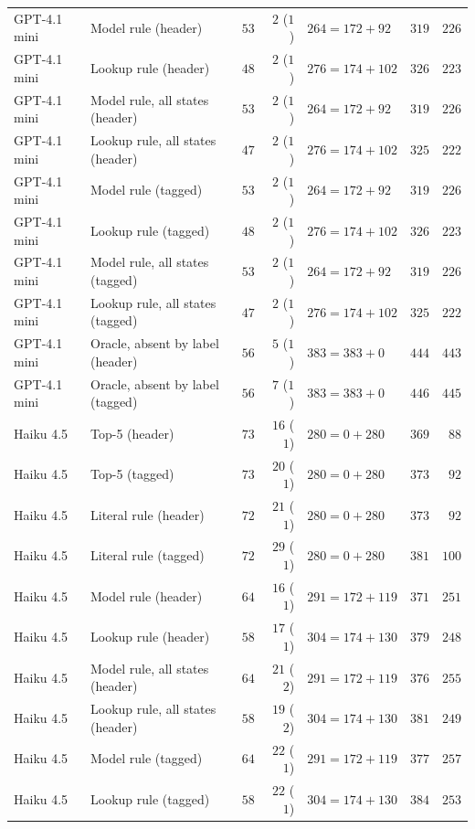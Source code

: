 \begin{table}[H]
\begin{tabular}{@{}llrrlrr@{}}
GPT-4.1 mini & Model rule (header) & $53$ & $2$ ($1$) & $264 = 172 + 92$ & $319$ & $226$ \\
GPT-4.1 mini & Lookup rule (header) & $48$ & $2$ ($1$) & $276 = 174 + 102$ & $326$ & $223$ \\
GPT-4.1 mini & Model rule, all states (header) & $53$ & $2$ ($1$) & $264 = 172 + 92$ & $319$ & $226$ \\
GPT-4.1 mini & Lookup rule, all states (header) & $47$ & $2$ ($1$) & $276 = 174 + 102$ & $325$ & $222$ \\
GPT-4.1 mini & Model rule (tagged) & $53$ & $2$ ($1$) & $264 = 172 + 92$ & $319$ & $226$ \\
GPT-4.1 mini & Lookup rule (tagged) & $48$ & $2$ ($1$) & $276 = 174 + 102$ & $326$ & $223$ \\
GPT-4.1 mini & Model rule, all states (tagged) & $53$ & $2$ ($1$) & $264 = 172 + 92$ & $319$ & $226$ \\
GPT-4.1 mini & Lookup rule, all states (tagged) & $47$ & $2$ ($1$) & $276 = 174 + 102$ & $325$ & $222$ \\
GPT-4.1 mini & Oracle, absent by label (header) & $56$ & $5$ ($1$) & $383 = 383 + 0$ & $444$ & $443$ \\
GPT-4.1 mini & Oracle, absent by label (tagged) & $56$ & $7$ ($1$) & $383 = 383 + 0$ & $446$ & $445$ \\ \midrule
Haiku 4.5 & Top-5 (header) & $73$ & $16$ ($1$) & $280 = 0 + 280$ & $369$ & $88$ \\
Haiku 4.5 & Top-5 (tagged) & $73$ & $20$ ($1$) & $280 = 0 + 280$ & $373$ & $92$ \\
Haiku 4.5 & Literal rule (header) & $72$ & $21$ ($1$) & $280 = 0 + 280$ & $373$ & $92$ \\
Haiku 4.5 & Literal rule (tagged) & $72$ & $29$ ($1$) & $280 = 0 + 280$ & $381$ & $100$ \\
Haiku 4.5 & Model rule (header) & $64$ & $16$ ($1$) & $291 = 172 + 119$ & $371$ & $251$ \\
Haiku 4.5 & Lookup rule (header) & $58$ & $17$ ($1$) & $304 = 174 + 130$ & $379$ & $248$ \\
Haiku 4.5 & Model rule, all states (header) & $64$ & $21$ ($2$) & $291 = 172 + 119$ & $376$ & $255$ \\
Haiku 4.5 & Lookup rule, all states (header) & $58$ & $19$ ($2$) & $304 = 174 + 130$ & $381$ & $249$ \\
Haiku 4.5 & Model rule (tagged) & $64$ & $22$ ($1$) & $291 = 172 + 119$ & $377$ & $257$ \\
Haiku 4.5 & Lookup rule (tagged) & $58$ & $22$ ($1$) & $304 = 174 + 130$ & $384$ & $253$ \\

\end{tabular}
\end{table}
